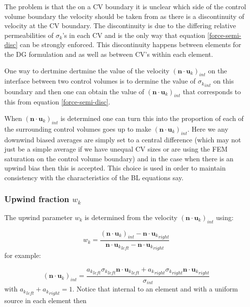 The problem is that the on a CV boundary it is unclear 
which side of the control volume boundary the velocity 
should be taken from as there is a discontinuity 
of velocity at the CV boundary. The discontinuity 
is due to the differing relative permeabilities of 
$\sigma_k$'s in each CV and is the only way that 
equation \ref{force-semi-disc} can be strongly enforced. 
This discontinuity happens between elements for the DG 
formulation and as well as between CV's within each element. 

One way to dertmine dertmine the value of the velocity 
$({{\mathbf n}\cdot{\mathbf u}_k})_{int}$ 
on the interface between two control volumes 
is to dermine the value of ${\sigma_k}_{int}$ on this boundary 
and then one can obtain the value of 
$({{\mathbf n}\cdot{\mathbf u}_k})_{int}$ that 
corresponds to this from equation \ref{force-semi-disc}. 

When $({{\mathbf n}\cdot{\mathbf u}_k})_{int}$ 
is determined one can turn this 
into the proportion of each of the surrounding control 
volumes goes up to make 
$({{\mathbf n}\cdot{\mathbf u}_k})_{int}$. Here we any downwind 
biased averages are simply set to a central difference 
(which may not just be a simple average if we have 
unequal CV sizes or are using the FEM saturation 
on the control volume boundary) and in the case 
when there is an upwind bias then this is accepted. 
This choice is used in order to maintain consistency 
with the characteristics of the BL equations say. 

\subsubsection{Upwind fraction $w_k$} 
The upwind parameter $w_k$ is 
determined from the velocity 
$({{\mathbf n}\cdot{\mathbf u}_k})_{int}$ using:

\begin{equation}
w_k= \frac{({{\mathbf n}\cdot{\mathbf u}_k})_{int} - {{\mathbf n}\cdot{\mathbf u}_k}_{right}}{{{\mathbf n}\cdot{\mathbf u}_k}_{left} - {{\mathbf n}\cdot{\mathbf u}_k}_{right}}
\label{w_k} 
\end{equation}
for example:

\begin{equation}
({{\mathbf n}\cdot{\mathbf u}_k})_{int}= \frac{{a_k}_{left} {\sigma_k}_{left} {{\mathbf n}\cdot{\mathbf u}_k}_{left} + {a_k}_{right} {\sigma_k}_{right} {{\mathbf n}\cdot{\mathbf u}_k}_{right}}{\sigma_{int}}
\end{equation}
with ${a_k}_{left}+{a_k}_{right}=1$. 
Notice that internal to an element and with a uniform 
source in each element then  

